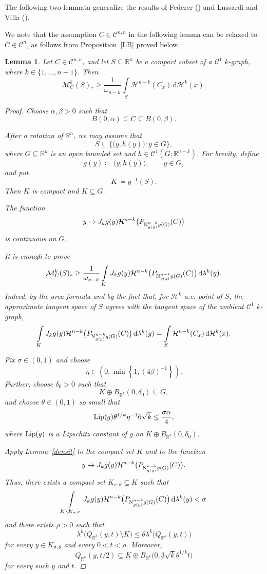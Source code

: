 \documentclass[pdflatex,sn-mathphys-num]{sn-jnl}
\theoremstyle{plain}
\newtheorem{lemma}[theorem]{Lemma}
\theoremstyle{definition}
\newcommand{\dH}[1]{\,\mathrm d\mathcal{H}^{#1}}
\newcommand{\dlambda}[1]{\,\mathrm d\lambda^{#1}}
\begin{document}
The following two lemmata generalize the results of Federer (\cite{federer}) and Lussardi and Villa (\cite{Villa2}). 

We note that the assumption $C\in\mathcal{C}^{n,n}$ in the following lemma can be relaxed to $C\in\mathcal{C}^{n}$, as follows from Proposition~\ref{LB} proved below.

\begin{lemma}\label{krecti}
Let $C\in\mathcal{C}^{n, n}$, and let $S\subseteq\mathbb{R}^n$ be a compact
subset of a $\mathcal{C}^1$ $k$-graph, where $k\in\{1, \dots, n-1\}$.
Then
\[
\mathcal{M}^k_{C}(S)_*
\geq
\frac{1}{\omega_{n-k}}
\int\limits_S\mathcal{H}^{n-k}(C_x)\dH{k}(x).
\]
\begin{proof}
Choose $\alpha, \beta>0$ such that
\[
B(0, \alpha)\subseteq C\subseteq B(0, \beta).
\]

After a rotation of $\mathbb{R}^n$, we may assume that
\[
S\subseteq \big\{\big(y, h(y)\big) : y\in G\big\},
\]
where $G\subseteq\mathbb R^k$ is an open bounded set and
$h\in\mathcal C^1(G; \mathbb R^{n-k})$. For brevity, define
\[
g(y)\coloneq \big(y, h(y)\big),\qquad y\in G,
\]
and put
\[
K\coloneq g^{-1}(S).
\]
Then $K$ is compact and $K\subseteq G$.

The function
\[
y\mapsto J_kg(y)\mathcal H^{n-k}
\big(P_{\textup{N}^{n-k}_{g(y)}g(G)}(C)\big)
\]
is continuous on $G$.

It is enough to prove
\[
\mathcal M_C^k(S)_*
\geq
\frac1{\omega_{n-k}}
\int\limits_K
J_kg(y)\mathcal H^{n-k}
\big(P_{\textup{N}^{n-k}_{g(y)}g(G)}(C)\big)\dlambda{k}(y).
\]
Indeed, by the area formula and by the fact that, for $\mathcal{H}^k$-a.e.
point of $S$, the approximate tangent space of $S$ agrees with the tangent
space of the ambient $\mathcal{C}^1$ $k$-graph,
\[
\int\limits_K
J_kg(y)\mathcal H^{n-k}
\big(P_{\textup{N}^{n-k}_{g(y)}g(G)}(C)\big)\dlambda{k}(y)
=
\int\limits_S \mathcal H^{n-k}(C_x)\dH{k}(x).
\]

Fix $\sigma\in(0, 1)$ and choose
\[
\eta\in\left(0, \min\left\{1, (4\beta)^{-1}\right\}\right).
\]
Further, choose $\delta_0>0$ such that
\[
K\oplus B_{\mathbb R^k}(0, \delta_0)\subseteq G,
\]and choose $\theta\in(0, 1)$ so small that
\[
\textup{Lip}(g)\theta^{1/k}\eta^{-1}6\sqrt{k}
\leq
\frac{\sigma\alpha}{4},
\]
where
$\textup{Lip}(g)$ is a Lipschitz constant of $g$ on $K\oplus B_{\mathbb R^k}(0, \delta_0).$

Apply Lemma~\ref{densit} to the compact set $K$ and to the function
\[
y\mapsto J_kg(y)\mathcal H^{n-k}
\big(P_{\textup{N}^{n-k}_{g(y)}g(G)}(C)\big).
\]
Thus, there exists a compact set $K_{\sigma, \theta}\subseteq K$ such that
\[
\int\limits_{K\setminus K_{\sigma,\theta}}
J_kg(y)\mathcal{H}^{n-k}
\big(P_{\textup{N}^{n-k}_{g(y)}g(G)}(C)\big)\dlambda{k}(y)
<\sigma
\]
and there exists $\rho>0$ such that
\[
\lambda^k\big(Q_{\mathbb{R}^k}(y, t)\setminus K\big)
\leq
\theta\lambda^k\big(Q_{\mathbb{R}^k}(y, t)\big)
\]
for every $y\in K_{\sigma,\theta}$ and every $0<t<\rho$. Moreover,
\[
Q_{\mathbb{R}^k}(y, t/2)
\subseteq
K\oplus B_{\mathbb R^k}\big(0, 3\sqrt{k}\theta^{1/k}t\big)
\]
for every such $y$ and $t$.


\end{proof}
\end{lemma}
\end{document}
